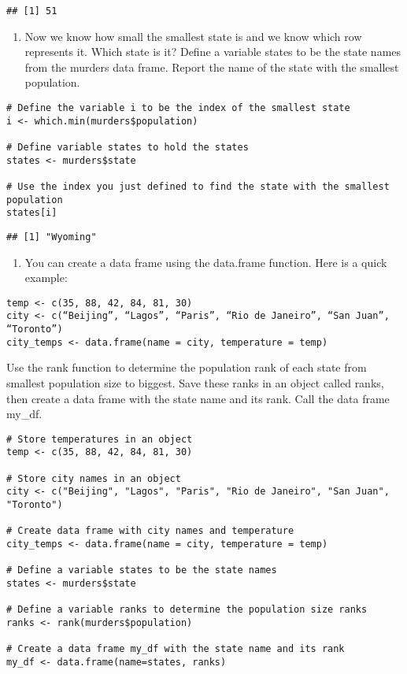 \documentclass[
]{article}
\providecommand{\tightlist}{%
  \setlength{\itemsep}{0pt}\setlength{\parskip}{0pt}}
\begin{document}
\begin{verbatim}
## [1] 51
\end{verbatim}

\begin{enumerate}
\def\labelenumi{\arabic{enumi}.}
\setcounter{enumi}{3}
\tightlist
\item
  Now we know how small the smallest state is and we know which row
  represents it. Which state is it? Define a variable states to be the
  state names from the murders data frame. Report the name of the state
  with the smallest population.
\end{enumerate}

\begin{verbatim}
# Define the variable i to be the index of the smallest state
i <- which.min(murders$population)

# Define variable states to hold the states
states <- murders$state

# Use the index you just defined to find the state with the smallest population
states[i]
\end{verbatim}

\begin{verbatim}
## [1] "Wyoming"
\end{verbatim}

\begin{enumerate}
\def\labelenumi{\arabic{enumi}.}
\setcounter{enumi}{4}
\tightlist
\item
  You can create a data frame using the data.frame function. Here is a
  quick example:
\end{enumerate}

\begin{verbatim}
temp <- c(35, 88, 42, 84, 81, 30)
city <- c(“Beijing”, “Lagos”, “Paris”, “Rio de Janeiro”, “San Juan”, “Toronto”)
city_temps <- data.frame(name = city, temperature = temp)
\end{verbatim}

Use the rank function to determine the population rank of each state
from smallest population size to biggest. Save these ranks in an object
called ranks, then create a data frame with the state name and its rank.
Call the data frame my\_df.

\begin{verbatim}
# Store temperatures in an object 
temp <- c(35, 88, 42, 84, 81, 30)

# Store city names in an object 
city <- c("Beijing", "Lagos", "Paris", "Rio de Janeiro", "San Juan", "Toronto")

# Create data frame with city names and temperature 
city_temps <- data.frame(name = city, temperature = temp)

# Define a variable states to be the state names 
states <- murders$state

# Define a variable ranks to determine the population size ranks 
ranks <- rank(murders$population)

# Create a data frame my_df with the state name and its rank
my_df <- data.frame(name=states, ranks)
\end{verbatim}
\end{document}
